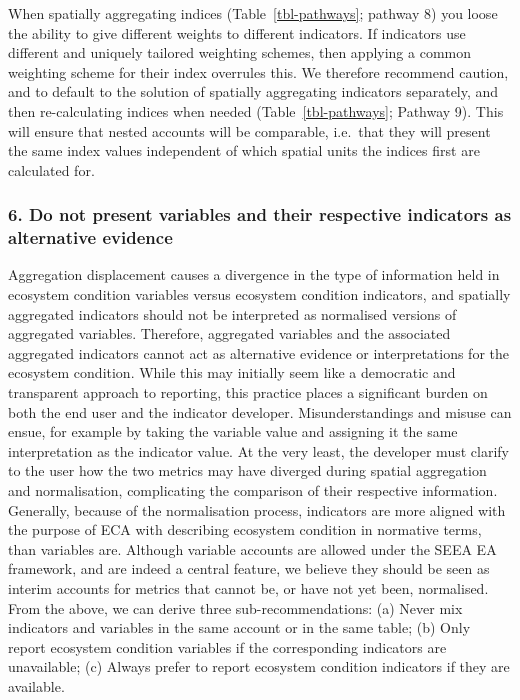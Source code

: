 \documentclass[
  authoryear,
  preprint,
  3p]{elsarticle}
\begin{document}
When spatially aggregating indices (Table~\ref{tbl-pathways}; pathway 8)
you loose the ability to give different weights to different indicators.
If indicators use different and uniquely tailored weighting schemes,
then applying a common weighting scheme for their index overrules this.
We therefore recommend caution, and to default to the solution of
spatially aggregating indicators separately, and then re-calculating
indices when needed (Table~\ref{tbl-pathways}; Pathway 9). This will
ensure that nested accounts will be comparable, i.e.~that they will
present the same index values independent of which spatial units the
indices first are calculated for.

\subsubsection*{6. Do not present variables and their respective
indicators as alternative
evidence}\label{do-not-present-variables-and-their-respective-indicators-as-alternative-evidence}

Aggregation displacement causes a divergence in the type of information
held in ecosystem condition variables versus ecosystem condition
indicators, and spatially aggregated indicators should not be
interpreted as normalised versions of aggregated variables. Therefore,
aggregated variables and the associated aggregated indicators cannot act
as alternative evidence or interpretations for the ecosystem condition.
While this may initially seem like a democratic and transparent approach
to reporting, this practice places a significant burden on both the end
user and the indicator developer. Misunderstandings and misuse can
ensue, for example by taking the variable value and assigning it the
same interpretation as the indicator value. At the very least, the
developer must clarify to the user how the two metrics may have diverged
during spatial aggregation and normalisation, complicating the
comparison of their respective information. Generally, because of the
normalisation process, indicators are more aligned with the purpose of
ECA with describing ecosystem condition in normative terms, than
variables are. Although variable accounts are allowed under the SEEA EA
framework, and are indeed a central feature, we believe they should be
seen as interim accounts for metrics that cannot be, or have not yet
been, normalised. From the above, we can derive three
sub-recommendations: (a) Never mix indicators and variables in the same
account or in the same table; (b) Only report ecosystem condition
variables if the corresponding indicators are unavailable; (c) Always
prefer to report ecosystem condition indicators if they are available.
\end{document}
